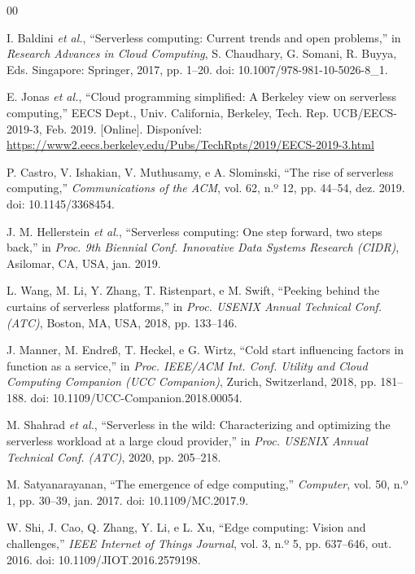 \documentclass[conference]{IEEEtran}
\begin{document}
\begin{thebibliography}{00}

 I. Baldini \textit{et al.}, ``Serverless computing: Current trends and open problems,'' in \textit{Research Advances in Cloud Computing}, S. Chaudhary, G. Somani, R. Buyya, Eds. Singapore: Springer, 2017, pp. 1--20. doi: 10.1007/978-981-10-5026-8\_1.

 E. Jonas \textit{et al.}, ``Cloud programming simplified: A Berkeley view on serverless computing,'' EECS Dept., Univ. California, Berkeley, Tech. Rep. UCB/EECS-2019-3, Feb. 2019. [Online]. Disponível: \url{https://www2.eecs.berkeley.edu/Pubs/TechRpts/2019/EECS-2019-3.html}

 P. Castro, V. Ishakian, V. Muthusamy, e A. Slominski, ``The rise of serverless computing,'' \textit{Communications of the ACM}, vol. 62, n.º 12, pp. 44--54, dez. 2019. doi: 10.1145/3368454.

 J. M. Hellerstein \textit{et al.}, ``Serverless computing: One step forward, two steps back,'' in \textit{Proc. 9th Biennial Conf. Innovative Data Systems Research (CIDR)}, Asilomar, CA, USA, jan. 2019.

 L. Wang, M. Li, Y. Zhang, T. Ristenpart, e M. Swift, ``Peeking behind the curtains of serverless platforms,'' in \textit{Proc. USENIX Annual Technical Conf. (ATC)}, Boston, MA, USA, 2018, pp. 133--146.

 J. Manner, M. Endreß, T. Heckel, e G. Wirtz, ``Cold start influencing factors in function as a service,'' in \textit{Proc. IEEE/ACM Int. Conf. Utility and Cloud Computing Companion (UCC Companion)}, Zurich, Switzerland, 2018, pp. 181--188. doi: 10.1109/UCC-Companion.2018.00054.

 M. Shahrad \textit{et al.}, ``Serverless in the wild: Characterizing and optimizing the serverless workload at a large cloud provider,'' in \textit{Proc. USENIX Annual Technical Conf. (ATC)}, 2020, pp. 205--218.

 M. Satyanarayanan, ``The emergence of edge computing,'' \textit{Computer}, vol. 50, n.º 1, pp. 30--39, jan. 2017. doi: 10.1109/MC.2017.9.

 W. Shi, J. Cao, Q. Zhang, Y. Li, e L. Xu, ``Edge computing: Vision and challenges,'' \textit{IEEE Internet of Things Journal}, vol. 3, n.º 5, pp. 637--646, out. 2016. doi: 10.1109/JIOT.2016.2579198.


\end{thebibliography}
\end{document}

